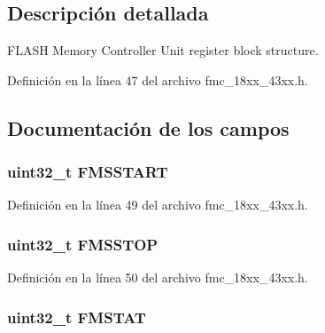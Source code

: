 \subsection{Descripción detallada}
F\+L\+A\+SH Memory Controller Unit register block structure. 

Definición en la línea 47 del archivo fmc\+\_\+18xx\+\_\+43xx.\+h.



\subsection{Documentación de los campos}
\subsubsection[{\texorpdfstring{F\+M\+S\+S\+T\+A\+RT}{FMSSTART}}]{ uint32\+\_\+t F\+M\+S\+S\+T\+A\+RT}\hypertarget{struct_l_p_c___f_m_c___t_afd931464b936767753c74cd28bb583b3}{}\label{struct_l_p_c___f_m_c___t_afd931464b936767753c74cd28bb583b3}


Definición en la línea 49 del archivo fmc\+\_\+18xx\+\_\+43xx.\+h.

\subsubsection[{\texorpdfstring{F\+M\+S\+S\+T\+OP}{FMSSTOP}}]{ uint32\+\_\+t F\+M\+S\+S\+T\+OP}\hypertarget{struct_l_p_c___f_m_c___t_af1e4121d1502bf5d3b8503f870cd298a}{}\label{struct_l_p_c___f_m_c___t_af1e4121d1502bf5d3b8503f870cd298a}


Definición en la línea 50 del archivo fmc\+\_\+18xx\+\_\+43xx.\+h.

\subsubsection[{\texorpdfstring{F\+M\+S\+T\+AT}{FMSTAT}}]{ uint32\+\_\+t F\+M\+S\+T\+AT}\hypertarget{struct_l_p_c___f_m_c___t_ab125f077a22f39008e3bb6d519565bd9}{}\label{struct_l_p_c___f_m_c___t_ab125f077a22f39008e3bb6d519565bd9}


